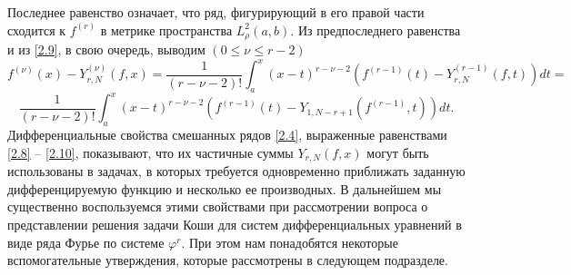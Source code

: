 Последнее равенство  означает, что ряд, фигурирующий  в его правой части сходится к $f^{(r)}$ в метрике пространства  $L^2_\rho(a,b)$. Из предпоследнего равенства и из  \eqref{2.9}, в свою очередь, выводим $(0\le\nu\le r-2)$
$$
f^{(\nu)}(x)-Y_{r,N}^{(\nu)}(f,x)= \frac{1}{(r-\nu-2)!}\int_a^x (x-t)^{r-\nu-2}(f^{(r-1)}(t)-Y_{r,N}^{(r-1)}(f,t))dt=
$$
\begin{equation}\label{2.10}
\frac{1}{(r-\nu-2)!}\int_a^x (x-t)^{r-\nu-2}(f^{(r-1)}(t)-Y_{1,N-r+1}(f^{(r-1)},t))dt.
\end{equation}
Дифференциальные свойства смешанных рядов \eqref{2.4}, выраженные равенствами \eqref{2.8} -- \eqref{2.10}, показывают, что их частичные суммы $Y_{r,N}(f,x)$  могут быть использованы в задачах, в которых требуется одновременно приближать заданную дифференцируемую функцию и несколько ее производных. В дальнейшем мы существенно воспользуемся этими свойствами при рассмотрении вопроса о представлении решения задачи Коши для систем дифференциальных уравнений в виде ряда Фурье по системе $\varphi^r$. При этом нам понадобятся некоторые вспомогательные утверждения, которые рассмотрены в следующем подразделе.


